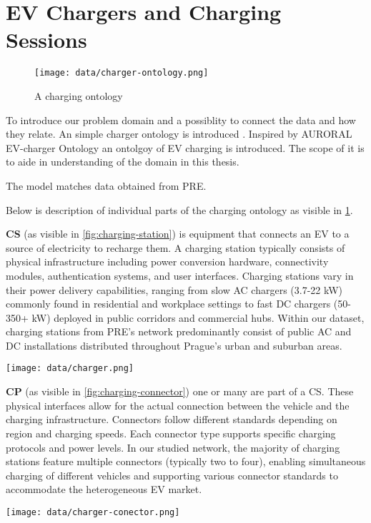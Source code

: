 \section{EV Chargers and Charging Sessions}


\begin{figure}[hb]
    \texttt{[image: data/charger-ontology.png]}
    \caption{A charging ontology}
    \label{fig:charging-ontology}
\end{figure}


To introduce our problem domain and a possiblity to connect the data and how they relate. An simple charger ontology is introduced . Inspired by AURORAL EV-charger Ontology  an ontolgoy of EV charging is introduced. The scope of it is to aide in understanding of the domain in this thesis.

The model matches data obtained from PRE.

Below is description of individual parts of the charging ontology as visible in \ref{fig:charging-ontology}.


\textbf{\acrlong{CS}} (as visible in \ref{fig:charging-station}) is equipment that connects an \acrshort{EV} to a source of electricity to recharge them. A charging station typically consists of physical infrastructure including power conversion hardware, connectivity modules, authentication systems, and user interfaces. Charging stations vary in their power delivery capabilities, ranging from slow AC chargers (3.7-22 kW) commonly found in residential and workplace settings to fast DC chargers (50-350+ kW) deployed in public corridors and commercial hubs. Within our dataset, charging stations from PRE's network predominantly consist of public AC and DC installations distributed throughout Prague's urban and suburban areas.

\begin{marginfigure}[]
    \centering
    \texttt{[image: data/charger.png]}
    \caption{Picture of \acrlong{CS}. It has one connector on each of its sides. One of which has charging cable attached.}
    \label{fig:charging-station}
\end{marginfigure}


\textbf{\acrlong{CP}} (as visible in \ref{fig:charging-connector}) one or many are part of a \acrshort{CS}. These physical interfaces allow for the actual connection between the vehicle and the charging infrastructure. Connectors follow different standards depending on region and charging speeds. Each connector type supports specific charging protocols and power levels. In our studied network, the majority of charging stations feature multiple connectors (typically two to four), enabling simultaneous charging of different vehicles and supporting various connector standards to accommodate the heterogeneous EV market.
\begin{marginfigure}[]
    \centering
    \texttt{[image: data/charger-conector.png]}
    \caption{View of 1 of the 2 charging connectors the \acrshort{CS} has}
    \label{fig:charging-connector}
\end{marginfigure}

